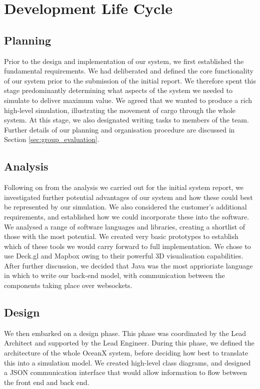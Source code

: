 \newpage
\section{Development Life Cycle}

\subsection{Planning}

Prior to the design and implementation of our system, we first established the fundamental requirements. We had deliberated and defined the core functionality of our system prior to the submission of the initial report. We therefore spent this stage predominantly determining what aspects of the system we needed to simulate to deliver maximum value. We agreed that we wanted to produce a rich high-level simulation, illustrating the movement of cargo through the whole system. At this stage, we also designated writing tasks to members of the team. Further details of our planning and organisation procedure are discussed in Section \ref{sec:group_evaluation}.

\subsection{Analysis}

Following on from the analysis we carried out for the initial system report, we investigated further potential advantages of our system and how these could best be represented by our simulation. We also considered the customer's additional requirements, and established how we could incorporate these into the software. We analysed a range of software languages and libraries, creating a shortlist of those with the most potential. We created very basic prototypes to establish which of these tools we would carry forward to full implementation. We chose to use Deck.gl and Mapbox owing to their powerful 3D visualisation capabilities. After further discussion, we decided that Java was the most apprioriate language in which to write our back-end model, with communication between the components taking place over websockets. 

\subsection{Design}

We then embarked on a design phase. This phase was coordinated by the Lead Architect and supported by the Lead Engineer. During this phase, we defined the architecture of the whole OceanX system, before deciding how best to translate this into a simulation model. We created high-level class diagrams, and designed a JSON communication interface that would allow information to flow between the front end and back end. 

